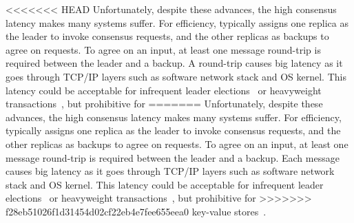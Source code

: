 

<<<<<<< HEAD
Unfortunately, despite these advances, the high \paxos consensus latency makes 
many systems suffer. For efficiency, \paxos typically assigns one replica as 
the leader to invoke consensus requests, and the other replicas as backups to 
agree on requests. To agree on an input, at least one message round-trip is 
required between the leader and a backup. A round-trip causes big latency as it 
goes through TCP/IP layers such as software network stack and OS kernel. This 
latency could be acceptable for infrequent 
leader elections~\cite{chubby:osdi,zookeeper} or 
heavyweight transactions~\cite{crane:sosp15,eve:osdi12}, but prohibitive for 
=======
Unfortunately, despite these advances, the high \paxos consensus latency makes
many systems suffer. For efficiency, \paxos typically assigns one replica as
the leader to invoke consensus requests, and the other replicas as backups to
agree on requests. To agree on an input, at least one message round-trip is
required between the leader and a backup. Each message causes big latency as it
goes through TCP/IP layers such as software network stack and OS kernel. This
latency could be acceptable for infrequent
leader elections~\cite{chubby:osdi,zookeeper} or
heavyweight transactions~\cite{crane:sosp15,eve:osdi12}, but prohibitive for
>>>>>>> f28eb51026f1d31454d02cf22eb4e7fee655eea0
key-value stores~\cite{redis,memcached}.


